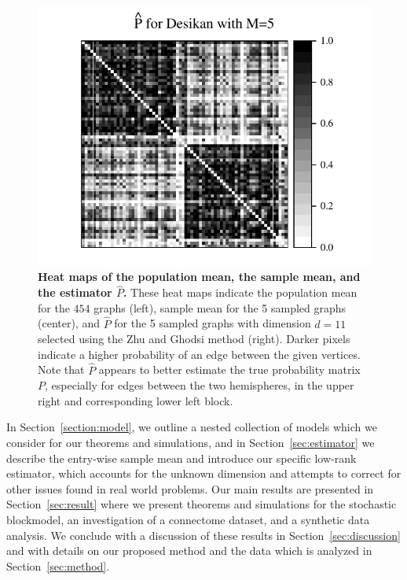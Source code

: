 \documentclass[10pt,letterpaper]{article}
\renewcommand{\hat}{\widehat}
\begin{document}
\begin{figure}[!htbp]
\includegraphics[height=.205\textheight]{Phat_desikan_m5.pdf}
\caption{{\bf Heat maps of the population mean, the sample mean, and the estimator $\hat{P}$.}
These heat maps indicate the population mean for the $454$ graphs (left), sample mean for the 5 sampled graphs (center), and $\hat{P}$ for the 5 sampled graphs with dimension $d=11$ selected using the Zhu and Ghodsi method (right).
Darker pixels indicate a higher probability of an edge between the given vertices.
Note that $\hat{P}$ appears to better estimate the true probability matrix $P$, especially for edges between the two hemispheres, in the upper right and corresponding lower left block.
}
\label{fig:Matrix_desikan_m5}
\end{figure}



In Section~\ref{section:model}, we outline a nested collection of models which we consider for our theorems and simulations, and in Section~\ref{sec:estimator} we describe the entry-wise sample mean and introduce our specific low-rank estimator, which accounts for the unknown dimension and attempts to correct for other issues found in real world problems.
Our main results are presented in Section~\ref{sec:result} where we present theorems and simulations for the stochastic blockmodel, an investigation of a connectome dataset, and a synthetic data analysis. 
We conclude with a discussion of these results in Section~\ref{sec:discussion}  and with details on our proposed method and the data which is analyzed in Section~\ref{sec:method}.
\end{document}
